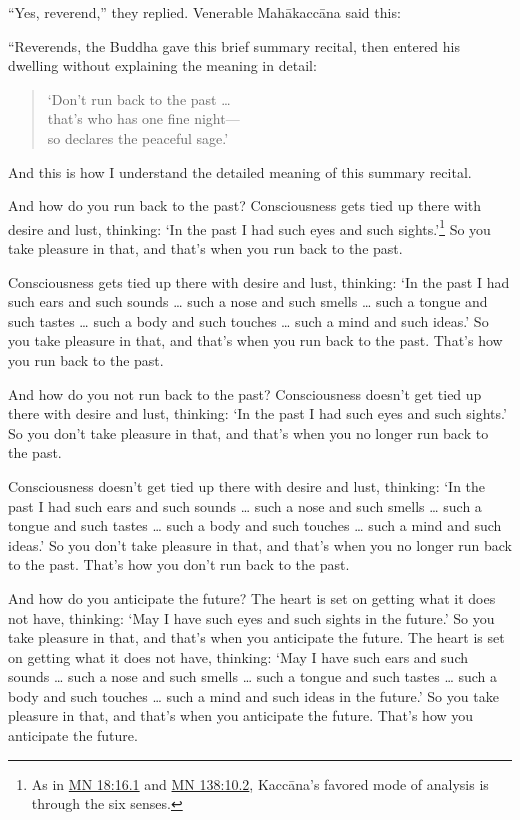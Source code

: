 \documentclass[12pt,openany]{book}%
\begin{document}
“Yes, reverend,” they replied. Venerable \textsanskrit{Mahākaccāna} said this: 

“Reverends, the Buddha gave this brief summary recital, then entered his dwelling without explaining the meaning in detail: 

\begin{verse}%
‘Don’t run back to the past … \\
that’s who has one fine night—\\
so declares the peaceful sage.’ 

%
\end{verse}

And this is how I understand the detailed meaning of this summary recital. 

And how do you run back to the past? Consciousness gets tied up there with desire and lust, thinking: ‘In the past I had such eyes and such sights.’\footnote{As in \href{https://suttacentral.net/mn18/en/sujato\#16.1}{MN 18:16.1} and \href{https://suttacentral.net/mn138/en/sujato\#10.2}{MN 138:10.2}, \textsanskrit{Kaccāna}’s favored mode of analysis is through the six senses. } So you take pleasure in that, and that’s when you run back to the past. 

Consciousness gets tied up there with desire and lust, thinking: ‘In the past I had such ears and such sounds … such a nose and such smells … such a tongue and such tastes … such a body and such touches … such a mind and such ideas.’ So you take pleasure in that, and that’s when you run back to the past. That’s how you run back to the past. 

And how do you not run back to the past? Consciousness doesn’t get tied up there with desire and lust, thinking: ‘In the past I had such eyes and such sights.’ So you don’t take pleasure in that, and that’s when you no longer run back to the past. 

Consciousness doesn’t get tied up there with desire and lust, thinking: ‘In the past I had such ears and such sounds … such a nose and such smells … such a tongue and such tastes … such a body and such touches … such a mind and such ideas.’ So you don’t take pleasure in that, and that’s when you no longer run back to the past. That’s how you don’t run back to the past. 

And how do you anticipate the future? The heart is set on getting what it does not have, thinking: ‘May I have such eyes and such sights in the future.’ So you take pleasure in that, and that’s when you anticipate the future. The heart is set on getting what it does not have, thinking: ‘May I have such ears and such sounds … such a nose and such smells … such a tongue and such tastes … such a body and such touches … such a mind and such ideas in the future.’ So you take pleasure in that, and that’s when you anticipate the future. That’s how you anticipate the future. 
\end{document}
